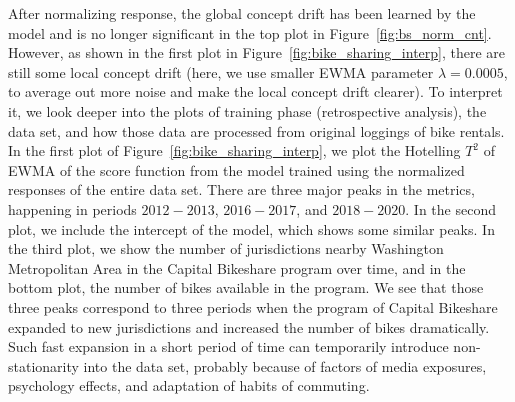 \documentclass[twoside,11pt]{article}
\begin{document}
After normalizing response, the global concept drift has been learned by the model and is no longer significant in the top plot in Figure~\ref{fig:bs_norm_cnt}. However, as shown in the first plot in Figure~\ref{fig:bike_sharing_interp}, there are still some local concept drift (here, we use smaller EWMA parameter $\lambda=0.0005$, to average out more noise and make the local concept drift clearer).
To interpret it, we look deeper into the plots of training phase (retrospective analysis), the data set, and how those data are processed from original loggings of bike rentals. In the first plot of Figure~\ref{fig:bike_sharing_interp}, we plot the Hotelling $T^2$ of EWMA of the score function from the model trained using the normalized responses of the entire data set. There are three major peaks in the metrics, happening in periods $2012-2013$, $2016-2017$, and $2018-2020$. In the second plot, we include the intercept of the model, which shows some similar peaks. In the third plot, we show the number of jurisdictions nearby Washington Metropolitan Area in the Capital Bikeshare program over time, and in the bottom plot, the number of bikes available in the program. We see that those three peaks correspond to three periods when the program of Capital Bikeshare expanded to new jurisdictions and increased the number of bikes dramatically. Such fast expansion in a short period of time can temporarily introduce non-stationarity into the data set, probably because of factors of media exposures, psychology effects, and adaptation of habits of commuting.
\end{document}
